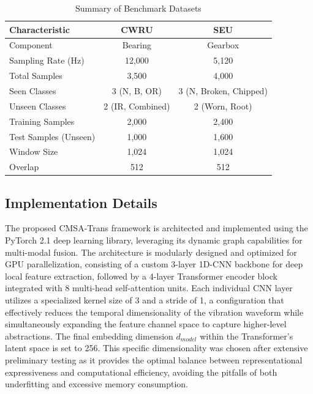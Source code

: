 \documentclass[journal]{IEEEtran}
\begin{document}
\begin{table}[!t]
\centering
\caption{Summary of Benchmark Datasets}
\label{tab:dataset}
\begin{tabular}{lcc}
\toprule
Characteristic & CWRU & SEU \\
\midrule
Component & Bearing & Gearbox \\
Sampling Rate (Hz) & 12,000 & 5,120 \\
Total Samples & 3,500 & 4,000 \\
Seen Classes & 3 (N, B, OR) & 3 (N, Broken, Chipped) \\
Unseen Classes & 2 (IR, Combined) & 2 (Worn, Root) \\
Training Samples & 2,000 & 2,400 \\
Test Samples (Unseen) & 1,000 & 1,600 \\
Window Size & 1,024 & 1,024 \\
Overlap & 512 & 512 \\
\bottomrule
\end{tabular}
\end{table}

\subsection{Implementation Details}
The proposed CMSA-Trans framework is architected and implemented using the PyTorch 2.1 deep learning library, leveraging its dynamic graph capabilities for multi-modal fusion. The architecture is modularly designed and optimized for GPU parallelization, consisting of a custom 3-layer 1D-CNN backbone for deep local feature extraction, followed by a 4-layer Transformer encoder block integrated with 8 multi-head self-attention units. Each individual CNN layer utilizes a specialized kernel size of 3 and a stride of 1, a configuration that effectively reduces the temporal dimensionality of the vibration waveform while simultaneously expanding the feature channel space to capture higher-level abstractions. The final embedding dimension $d_{model}$ within the Transformer's latent space is set to 256. This specific dimensionality was chosen after extensive preliminary testing as it provides the optimal balance between representational expressiveness and computational efficiency, avoiding the pitfalls of both underfitting and excessive memory consumption. 
\end{document}

